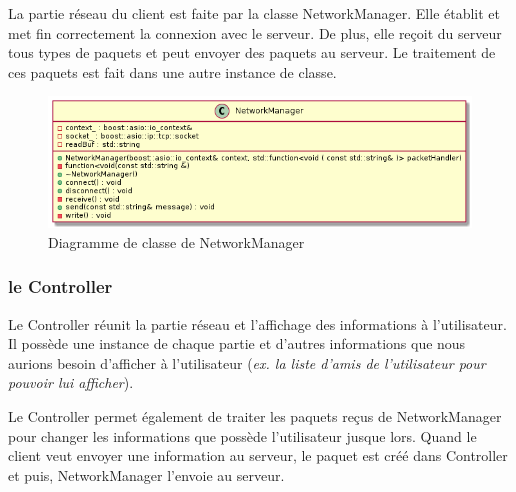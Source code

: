 \documentclass{article}
\begin{document}
La partie réseau du client est faite par la classe NetworkManager. Elle établit et met fin correctement la connexion avec le serveur. De plus, elle reçoit du serveur tous types de paquets et peut envoyer des paquets au serveur. Le traitement de ces paquets est fait dans une autre instance de classe.

\begin{figure}[!ht]
	\centering
	 \includegraphics[scale=0.5]{../res/uml/class/NetworkManagerClass.png}
	 \caption{Diagramme de classe de NetworkManager}
	 \label{fig:NetworkManagerDiagram}
\end{figure}

\subsubsection{le Controller}

Le Controller réunit la partie réseau et l'affichage des informations à l'utilisateur. Il possède une instance de chaque partie et d'autres informations que nous aurions besoin d'afficher à l'utilisateur (\textit{ex. la liste d'amis de l'utilisateur pour pouvoir lui afficher}). 

Le Controller permet également de traiter les paquets reçus de NetworkManager pour changer les informations que possède l'utilisateur jusque lors. Quand le client veut envoyer une information au serveur, le paquet est créé dans Controller et puis, NetworkManager l'envoie au serveur.
\end{document}
